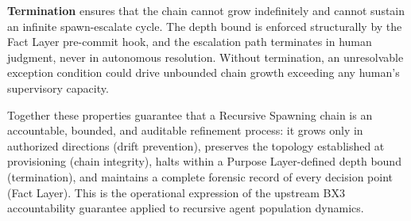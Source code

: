 \medskip
\textbf{Termination} ensures that the chain cannot grow indefinitely and cannot sustain an infinite spawn-escalate cycle. The depth bound is enforced structurally by the Fact Layer pre-commit hook, and the escalation path terminates in human judgment, never in autonomous resolution. Without termination, an unresolvable exception condition could drive unbounded chain growth exceeding any human's supervisory capacity.

\medskip
Together these properties guarantee that a Recursive Spawning chain is an accountable, bounded, and auditable refinement process: it grows only in authorized directions (drift prevention), preserves the topology established at provisioning (chain integrity), halts within a Purpose Layer-defined depth bound (termination), and maintains a complete forensic record of every decision point (Fact Layer). This is the operational expression of the upstream BX3 accountability guarantee applied to recursive agent population dynamics.
